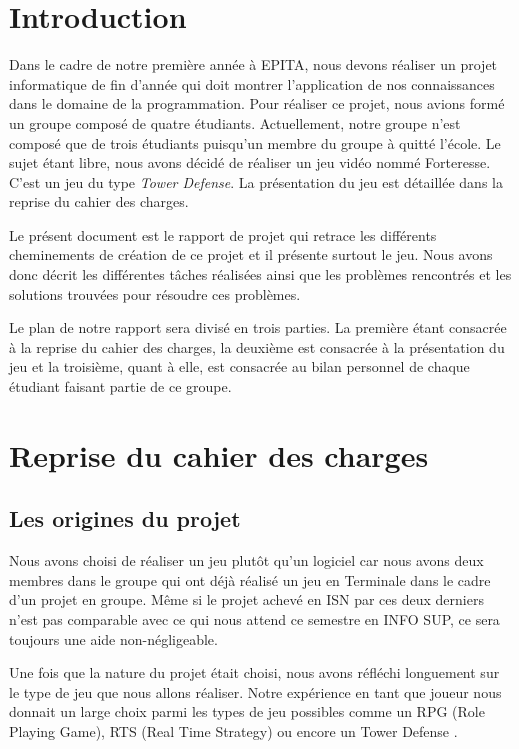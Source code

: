 \documentclass[a4paper, 12pt]{article}
\begin{document}
\newpage
\section{Introduction}
Dans le cadre de notre première année à EPITA, nous devons réaliser un projet informatique de fin d’année qui doit montrer l’application de nos connaissances dans le domaine de la programmation. Pour réaliser ce projet, nous avions formé un groupe composé de quatre étudiants. Actuellement, notre groupe n’est composé que de trois étudiants puisqu’un membre du groupe à quitté l’école.
Le sujet étant libre, nous avons décidé de réaliser un jeu vidéo nommé Forteresse. C’est un jeu du type \textit{Tower Defense}. La présentation du jeu est détaillée dans la reprise du cahier des charges.  
	\par Le présent document est  le rapport de projet  qui retrace les différents cheminements de création de ce projet  et il présente surtout le jeu.  Nous avons donc décrit les différentes tâches réalisées ainsi que les problèmes rencontrés et les solutions trouvées pour résoudre ces problèmes.
	\par Le plan de notre rapport sera divisé en trois parties. La première étant consacrée à la reprise du cahier des charges, la deuxième est consacrée à la présentation du jeu et la troisième, quant à elle, est consacrée au bilan personnel de chaque étudiant faisant partie de ce groupe.


\newpage
\section{Reprise du cahier des charges}
\subsection{Les origines du projet}
Nous avons choisi de réaliser un jeu plutôt qu’un logiciel car nous avons deux membres dans le groupe qui ont déjà réalisé un jeu en Terminale dans le cadre d’un projet en groupe. Même si le projet achevé en ISN par ces deux derniers n’est pas comparable avec ce qui nous attend ce semestre en INFO SUP, ce sera toujours une aide non-négligeable.
\par Une fois que la nature du projet était choisi, nous avons réfléchi longuement sur le type de jeu que nous allons réaliser. Notre expérience en tant que joueur nous donnait un large choix parmi les types de jeu possibles comme un RPG (Role Playing Game), RTS (Real Time Strategy) ou encore un Tower Defense . 
\end{document}

